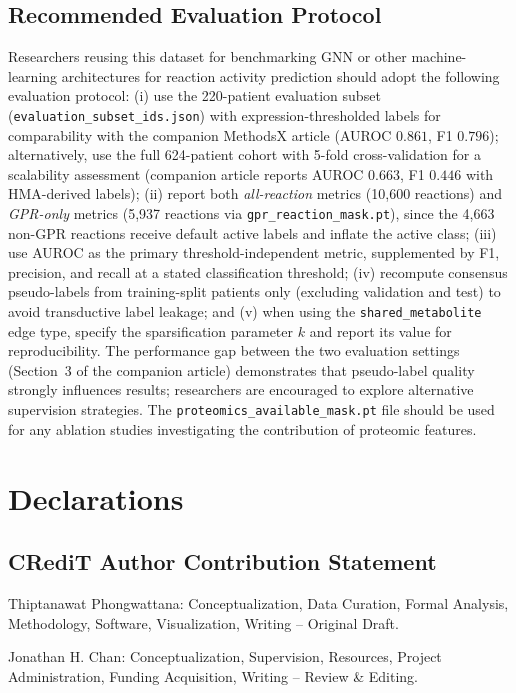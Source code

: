 \documentclass[12pt,a4paper]{article}
\begin{document}
\subsection{Recommended Evaluation Protocol}

Researchers reusing this dataset for benchmarking GNN or other machine-learning architectures for reaction activity prediction should adopt the following evaluation protocol: (i) use the 220-patient evaluation subset (\texttt{evaluation\_subset\_ids.json}) with expression-thresholded labels for comparability with the companion MethodsX article (AUROC $0.861$, F1 $0.796$); alternatively, use the full 624-patient cohort with 5-fold cross-validation for a scalability assessment (companion article reports AUROC $0.663$, F1 $0.446$ with HMA-derived labels); (ii) report both \textit{all-reaction} metrics (10,600 reactions) and \textit{GPR-only} metrics (5,937 reactions via \texttt{gpr\_reaction\_mask.pt}), since the 4,663 non-GPR reactions receive default active labels and inflate the active class; (iii) use AUROC as the primary threshold-independent metric, supplemented by F1, precision, and recall at a stated classification threshold; (iv) recompute consensus pseudo-labels from training-split patients only (excluding validation and test) to avoid transductive label leakage; and (v) when using the \texttt{shared\_metabolite} edge type, specify the sparsification parameter $k$ and report its value for reproducibility. The performance gap between the two evaluation settings (Section~3 of the companion article) demonstrates that pseudo-label quality strongly influences results; researchers are encouraged to explore alternative supervision strategies. The \texttt{proteomics\_available\_mask.pt} file should be used for any ablation studies investigating the contribution of proteomic features.

\section*{Declarations}

\subsection*{CRediT Author Contribution Statement}

Thiptanawat Phongwattana: Conceptualization, Data Curation, Formal Analysis, Methodology, Software, Visualization, Writing -- Original Draft.

Jonathan H. Chan: Conceptualization, Supervision, Resources, Project Administration, Funding Acquisition, Writing -- Review \& Editing.
\end{document}
